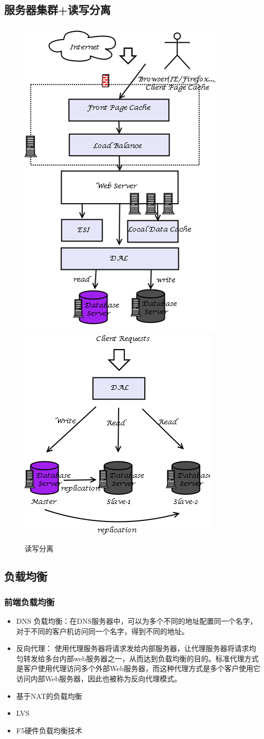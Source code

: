 \documentclass[UTF8,a4paper,12pt]{ctexbook}
\begin{document}
		\subsection{服务器集群+读写分离}
			\begin{figure}[ht]
			\centering
				\includegraphics[width=0.4\linewidth]{figures/server-readwrite}
				\includegraphics[width=0.4\linewidth]{figures/server-readwrite2}
				\caption{读写分离}
				\label{fig:server-readwrite}
			\end{figure}
			
		\subsection{负载均衡}
			\subsubsection{前端负载均衡}
				\begin{itemize}
					\item DNS 负载均衡：在DNS服务器中，可以为多个不同的地址配置同一个名字，对于不同的客户机访问同一个名字，得到不同的地址。
					
					\item 反向代理： 使用代理服务器将请求发给内部服务器，让代理服务器将请求均匀转发给多台内部web服务器之一，从而达到负载均衡的目的。标准代理方式是客户使用代理访问多个外部Web服务器，而这种代理方式是多个客户使用它访问内部Web服务器，因此也被称为反向代理模式。
					
					\item 基于NAT的负载均衡
					\item LVS
					\item F5硬件负载均衡技术
				\end{itemize}
\end{document}
